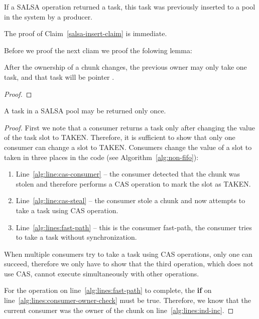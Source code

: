 \begin{claim}
\label{salsa-insert-claim}
 If a SALSA operation returned a task, this task was previously inserted to a pool in the system by a producer.
\end{claim}
The proof of Claim~\ref{salsa-insert-claim} is immediate.



Before we proof the next cliam we proof the folowing lemma:

\begin{lemma}
 After the ownership of a chunk changes, the previous owner may only take one task, and that task will be pointer .
\end{lemma}
\begin{proof}
 
\end{proof}




\begin{claim}
\label{salsa-consumer-claim}
A task in a SALSA pool may be returned only once.
\end{claim}

\begin{proof}
First we note that a consumer returns a task only after changing the value of the task slot to TAKEN. 
Therefore, it is sufficient to show that only one consumer can change a slot to TAKEN.
Consumers change the value of a slot to taken in three places in the code (see Algorithm~\ref{alg:non-fifo}):
\begin{enumerate}
 \item Line~\ref{alg:line:cas-consumer} -- the consumer detected that the chunk was stolen and therefore performs a CAS operation to mark the slot as TAKEN.
 \item Line~\ref{alg:line:cas-steal} -- the consumer stole a chunk and now attempts to take a task using CAS operation.
 \item Line~\ref{alg:lines:fast-path} -- this is the consumer fast-path, the consumer tries to take a task without synchronization.
\end{enumerate}

When multiple consumers try to take a task using CAS operations, only one can succeed, therefore we only have to show that the third operation, which does not use CAS, cannot execute simultaneously with other operations.

For the operation on line~\ref{alg:lines:fast-path} to complete, the {\bf if} on line~\ref{alg:lines:consumer-owner-check} must be true. Therefore, we know that the current consumer was the owner of the chunk on line~\ref{alg:lines:ind-inc}.

\end{proof}
